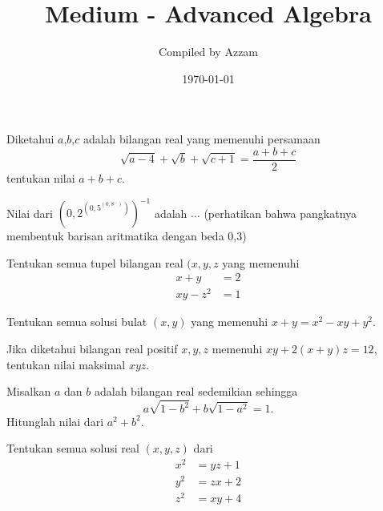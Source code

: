 \documentclass[11pt]{scrartcl}
\begin{document}
	\title{Medium - Advanced Algebra} %
	\date{\today}
	\author{Compiled by Azzam}
	\maketitle
	
	\begin{soalbaru}
	Diketahui $a$,$b$,$c$ adalah bilangan real yang memenuhi persamaan
	$$\sqrt{a-4}+\sqrt{b}+\sqrt{c+1}=\dfrac{a+b+c}{2}$$
	tentukan nilai $a+b+c$.
	\end{soalbaru}
	
	\begin{soalbaru}
	Nilai dari $\left(0,2 ^{\left(0,5 ^{\left(0,8 ^{...} \right)} \right)} \right)^{-1}$ adalah $\dots$ (perhatikan bahwa pangkatnya membentuk barisan aritmatika dengan beda 0,3)
	\end{soalbaru}
	
	\begin{soalbaru}
	Tentukan semua tupel bilangan real $(x,y,z$ yang memenuhi
	\begin{align*}
	  x+y &= 2 \\
	xy-z^2 &= 1  
	\end{align*}
	\end{soalbaru}
	
	\begin{soalbaru}
	Tentukan semua solusi bulat $(x,y)$ yang memenuhi 
	$x+y=x^2-xy+y^2.$
	\end{soalbaru}
	
    \begin{soalbaru}
    Jika diketahui bilangan real positif $x,y,z$ memenuhi $xy+2(x+y)z=12$, tentukan nilai maksimal $xyz.$
    \end{soalbaru}
    
    \begin{soalbaru}
    Misalkan $a$ dan $b$ adalah bilangan real sedemikian sehingga $$a\sqrt{1-b^2}+b\sqrt{1-a^2}=1.$$
    Hitunglah nilai dari $a^2+b^2$.
    \end{soalbaru}
    
    \begin{soalbaru}
    Tentukan semua solusi real $(x,y,z)$ dari
    \begin{align*}
        x^2 &= yz+1\\
        y^2 &= zx+2\\
        z^2 &= xy+4
    \end{align*}
    \end{soalbaru}
    
\end{document}
